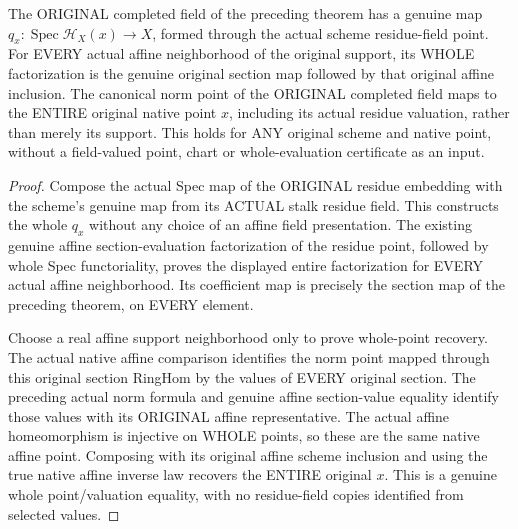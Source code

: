 \begin{theorem}
\label{scheme:actual-native-completed-field-point}
\leanok
{}
The ORIGINAL completed field of the preceding theorem has a genuine map
$q_x:\operatorname{Spec}\mathcal H_X(x)\to X$, formed through the actual
scheme residue-field point. For EVERY actual affine neighborhood of the
original support, its WHOLE factorization is the genuine original section
map followed by that original affine inclusion. The canonical norm point
of the ORIGINAL completed field maps to the ENTIRE original native point
$x$, including its actual residue valuation, rather than merely its support.
This holds for ANY original scheme and native point, without a field-valued
point, chart or whole-evaluation certificate as an input.
\end{theorem}
\begin{proof}
Compose the actual Spec map of the ORIGINAL residue embedding with the
scheme's genuine map from its ACTUAL stalk residue field. This constructs
the whole $q_x$ without any choice of an affine field presentation. The
existing genuine affine section-evaluation factorization of the residue
point, followed by whole Spec functoriality, proves the displayed entire
factorization for EVERY actual affine neighborhood. Its coefficient map is
precisely the section map of the preceding theorem, on EVERY element.

Choose a real affine support neighborhood only to prove whole-point recovery.
The actual native affine comparison identifies the norm point mapped through
this original section RingHom by the values of EVERY original section. The
preceding actual norm formula and genuine affine section-value equality
identify those values with its ORIGINAL affine representative. The actual
affine homeomorphism is injective on WHOLE points, so these are the same
native affine point. Composing with its original affine scheme inclusion
and using the true native affine inverse law recovers the ENTIRE original
$x$. This is a genuine whole point/valuation equality, with no residue-field
copies identified from selected values.
\end{proof}
